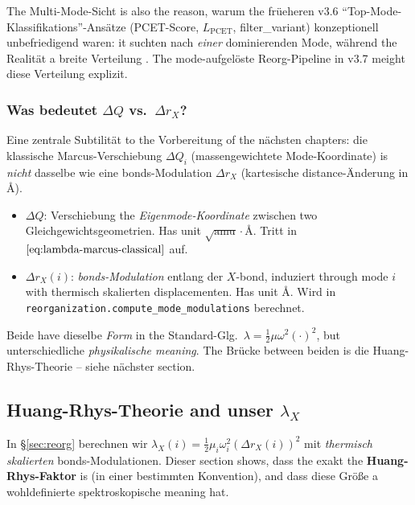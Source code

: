 \documentclass[11pt,a4paper,twoside]{article}
\providecommand{\angstrom}{\text{\AA}}    %
\theoremstyle{remark}
\begin{document}
The Multi-Mode-Sicht is also the reason, warum the fr\"ueheren v3.6
"`Top-Mode-Klassifikations"'-Ans\"atze (PCET-Score, $L_\text{PCET}$,
filter\_variant) konzeptionell unbefriedigend waren: it suchten nach
\emph{einer} dominierenden Mode, w\"ahrend the Realit\"at a breite
Verteilung . The mode-aufgel\"oste Reorg-Pipeline in v3.7 meight
diese Verteilung explizit.

\subsubsection*{Was bedeutet $\Delta Q$ vs.\ $\Delta r_X$?}

Eine zentrale Subtilit\"at to the Vorbereitung of the n\"achsten chapters: die
klassische Marcus-Verschiebung $\Delta Q_i$ (massengewichtete
Mode-Koordinate) is \emph{nicht} dasselbe wie eine
bonds-Modulation $\Delta r_X$ (kartesische distance-\"Anderung in
$\angstrom$).

\begin{itemize}\setlength{\itemsep}{0pt}
  \item $\Delta Q$: Verschiebung the \emph{Eigenmode-Koordinate} zwischen
        two Gleichgewichtsgeometrien. Has unit
        $\sqrt{\text{amu}}\cdot\angstrom$. Tritt in
        $\eqref{eq:lambda-marcus-classical}$ auf.
  \item $\Delta r_X(i)$: \emph{bonds-Modulation} entlang der
        $X$-bond, induziert through mode $i$ with thermisch
        skalierten displacementen. Has unit $\angstrom$. Wird in
        \texttt{reorganization.compute\_mode\_modulations} berechnet.
\end{itemize}

Beide have dieselbe \emph{Form} in the Standard-Glg.\
$\lambda = \tfrac{1}{2}\mu\omega^2(\cdot)^2$, but unterschiedliche
\emph{physikalische meaning}. The Br\"ucke between beiden is die
Huang-Rhys-Theorie -- siehe n\"achster section.

\subsection{Huang-Rhys-Theorie and unser $\lambda_X$}
\label{sec:huang-rhys}

In \S\ref{sec:reorg} berechnen wir
$\lambda_X(i) = \tfrac{1}{2}\mu_i\omega_i^2(\Delta r_X(i))^2$ mit
\emph{thermisch skalierten} bonds-Modulationen. Dieser section
shows, dass the exakt the \textbf{Huang-Rhys-Faktor} is (in einer
bestimmten Konvention), and dass diese Gr\"o{\ss}e a wohldefinierte
spektroskopische meaning hat.
\end{document}
